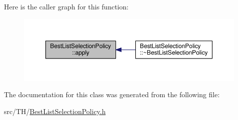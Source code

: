 Here is the caller graph for this function\+:
\nopagebreak
\begin{figure}[H]
\begin{center}
\leavevmode
\includegraphics[width=350pt]{classBestListSelectionPolicy_ae387a1ef0a3a597134edf198e5ab1299_icgraph}
\end{center}
\end{figure}




The documentation for this class was generated from the following file\+:\begin{DoxyCompactItemize}
\item 
src/\+T\+H/\hyperlink{BestListSelectionPolicy_8h}{Best\+List\+Selection\+Policy.\+h}\end{DoxyCompactItemize}
